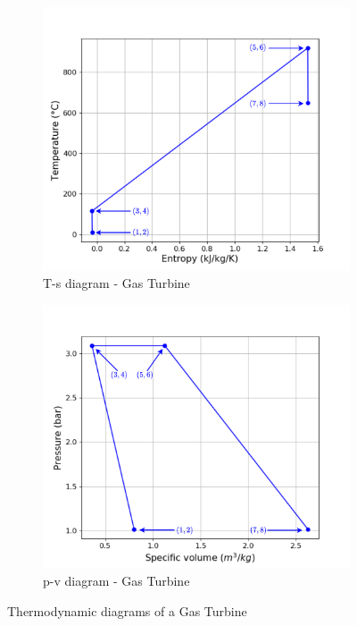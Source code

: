 \begin{figure}[H]
     \centering
     \begin{subfigure}[b]{0.4\textwidth}
         \centering
         \includegraphics[width=\textwidth]{Ts_GT}
         \caption{T-s diagram - Gas Turbine}
         \label{fig:C5_Ts_GT}
     \end{subfigure}
     \begin{subfigure}[b]{0.4\textwidth}
         \centering
         \includegraphics[width=\textwidth]{pv_GT}
         \caption{p-v diagram - Gas Turbine}
         \label{fig:C5_pv_GT}
     \end{subfigure}
        \caption{Thermodynamic diagrams of a Gas Turbine}
        \label{fig:C5_thermo_diagram_GT}
\end{figure}

